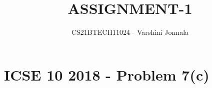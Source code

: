 \documentclass[journal,12pt,twocolumn]{IEEEtran}
\DeclareMathOperator*{\Res}{Res}
\begin{document}
\newcommand{\BEQA}{\begin{eqnarray}}
\newcommand{\EEQA}{\end{eqnarray}}
\newcommand{\define}{\stackrel{\triangle}{=}}

\raggedbottom

\newtheorem{rem}{Remark}
\newcommand{\sgn}{\mathop{\mathrm{sgn}}}
\providecommand{\abs}[1]{\vert#1\vert}
\providecommand{\res}[1]{\Res\displaylimits_{#1}} 
\providecommand{\norm}[1]{\lVert#1\rVert}

\providecommand{\mtx}[1]{\mathbf{#1}}
\providecommand{\mean}[1]{E[ #1 ]}
\providecommand{\fourier}{\overset{\mathcal{F}}{ \rightleftharpoons}}

\newcommand{\question}{\noindent \textbf{Question: }}
\newcommand{\solution}{\noindent \textbf{Solution: }}
\providecommand{\dec}[2]{\ensuremath{\overset{#1}{\underset{#2}{\gtrless}}}}
\newcommand{\myvec}[1]{\ensuremath{\begin{pmatrix}#1\end{pmatrix}}}
\newcommand{\mydet}[1]{\ensuremath{\begin{vmatrix}#1\end{vmatrix}}}
\makeatletter
{}
\makeatother
\let\StandardTheFigure\thefigure
\let\vec\mathbf
\renewcommand{\thefigure}{\theproblem}
\def\putbox#1#2#3{\makebox[0in][l]{\makebox[#1][l]{}\raisebox{\baselineskip}[0in][0in]{\raisebox{#2}[0in][0in]{#3}}}}
     \def\rightbox#1{\makebox[0in][r]{#1}}
     \def\centbox#1{\makebox[0in]{#1}}
     \def\topbox#1{\raisebox{-\baselineskip}[0in][0in]{#1}}
     \def\midbox#1{\raisebox{-0.5\baselineskip}[0in][0in]{#1}}
\vspace{3cm}
\title{
   ASSIGNMENT-1
}
\author{CS21BTECH11024 - Varshini  Jonnala}	

\maketitle

\bigskip
\renewcommand{\thefigure}{\theenumi}
\renewcommand{\thetable}{\theenumi}

\section*{ICSE 10 2018 - Problem 7(c)}
\end{document}
